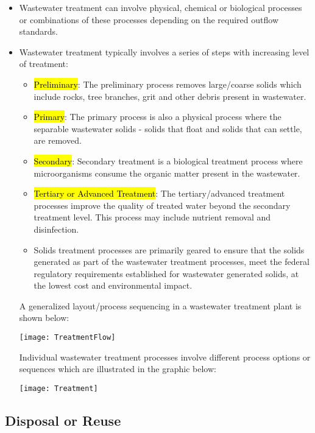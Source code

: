 \begin{itemize}
\item Wastewater treatment can involve physical, chemical or biological processes or combinations of these processes depending on the required outflow standards. 
\item Wastewater treatment typically involves a series of steps with increasing level of treatment:
\begin{itemize}
\item \hl{Preliminary}:  The preliminary process removes large/coarse solids which include rocks, tree branches, grit and other debris present in wastewater.
\item \hl{Primary}:  The primary process is also a physical process where the separable wastewater solids - solids that float and solids that can settle, are removed.  
\item \hl{Secondary}:  Secondary treatment is a biological treatment process where microorganisms consume the organic matter present in the wastewater. 
\item \hl{Tertiary or Advanced Treatment}:  The tertiary/advanced treatment processes improve the quality of treated water beyond the secondary treatment level.  This process may include nutrient removal and disinfection.

\item Solids treatment processes are primarily geared to ensure that the solids generated as part of the wastewater treatment processes, meet the federal regulatory requirements established for wastewater generated solids, at the lowest cost and environmental impact.
\end{itemize}

A generalized layout/process sequencing in a wastewater treatment plant is shown below:
\begin{center}
\texttt{[image: TreatmentFlow]}
\end{center}
Individual wastewater treatment processes involve different process options or sequences which are illustrated in the graphic below:
\begin{center}
\texttt{[image: Treatment]}
\end{center}
\end{itemize}

\subsection{Disposal or Reuse}

